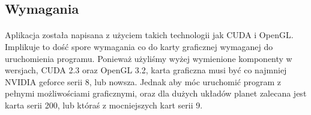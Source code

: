 \subsection{Wymagania}\label{sub:wymagania}
\paragraph{}

Aplikacja została napisana z użyciem takich technologii jak CUDA i OpenGL. Implikuje to dość spore wymagania co do karty graficznej wymaganej do uruchomienia programu. Ponieważ użyliśmy wyżej wymienione komponenty w wersjach, CUDA 2.3 oraz OpenGL 3.2, karta graficzna musi być co najmniej NVIDIA geforce serii 8, lub nowsza. Jednak aby móc uruchomić program z pełnymi możliwościami graficznymi, oraz dla dużych układów planet zalecana jest karta serii 200, lub któraś z mocniejszych kart serii 9.

\paragraph{}




